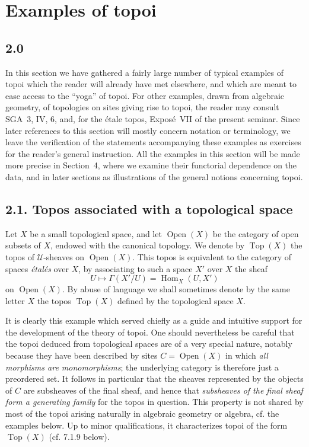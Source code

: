 \documentclass[11pt]{article}
\newcommand{\U}{\mathcal{U}}
\newcommand{\Top}{\operatorname{Top}}
\newcommand{\Open}{\operatorname{Open}}
\newcommand{\Hom}{\operatorname{Hom}}
\begin{document}
\section{Examples of topoi}

\subsection*{2.0}
In this section we have gathered a fairly large number of typical examples of topoi which the reader will already have met elsewhere, and which are meant to ease access to the ``yoga'' of topoi. For other examples, drawn from algebraic geometry, of topologies on sites giving rise to topoi, the reader may consult SGA~3, IV, 6, and, for the \'etale topos, Expos\'e~VII of the present seminar. Since later references to this section will mostly concern notation or terminology, we leave the verification of the statements accompanying these examples as exercises for the reader's general instruction. All the examples in this section will be made more precise in Section~4, where we examine their functorial dependence on the data, and in later sections as illustrations of the general notions concerning topoi.

\subsection*{2.1. Topos associated with a topological space}
Let \(X\) be a small topological space, and let \(\Open(X)\) be the category of open subsets of \(X\), endowed with the canonical topology. We denote by \(\Top(X)\) the topos of \(\U\)-sheaves on \(\Open(X)\). This topos is equivalent to the category of spaces \emph{\'etal\'es} over \(X\), by associating to such a space \(X'\) over \(X\) the sheaf
\[
U\longmapsto \Gamma(X'/U)=\Hom_X(U,X')
\]
on \(\Open(X)\). By abuse of language we shall sometimes denote by the same letter \(X\) the topos \(\Top(X)\) defined by the topological space \(X\).

It is clearly this example which served chiefly as a guide and intuitive support for the development of the theory of topoi. One should nevertheless be careful that the topoi deduced from topological spaces are of a very special nature, notably because they have been described by sites \(C=\Open(X)\) in which \emph{all morphisms are monomorphisms}; the underlying category is therefore just a preordered set. It follows in particular that the sheaves represented by the objects of \(C\) are subsheaves of the final sheaf, and hence that \emph{subsheaves of the final sheaf form a generating family} for the topos in question. This property is not shared by most of the topoi arising naturally in algebraic geometry or algebra, cf. the examples below. Up to minor qualifications, it characterizes topoi of the form \(\Top(X)\) (cf. 7.1.9 below).
\end{document}

